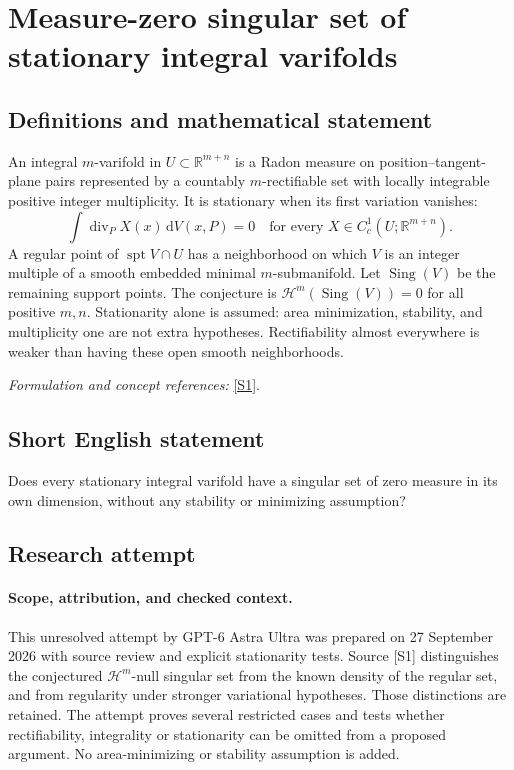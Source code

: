 \documentclass[11pt]{article}
\begin{document}
\section*{\texorpdfstring{Measure-zero singular set of stationary integral varifolds}{Measure-zero singular set of stationary integral varifolds}}\label{30006915}
\subsection{Definitions and mathematical statement}
An integral $m$-varifold in $U\subset{\mathbb{R}}^{m+n}$ is a Radon measure on position--tangent-plane pairs represented by a countably $m$-rectifiable set with locally integrable positive integer multiplicity. It is stationary when its first variation vanishes:
\[
 \int\operatorname{div}_P X(x){\,\mathrm{d}} V(x,P)=0
 \quad\text{for every }X\in C_c^1(U;{\mathbb{R}}^{m+n}).
\]
A regular point of $\operatorname{spt}V\cap U$ has a neighborhood on which $V$ is an integer multiple of a smooth embedded minimal $m$-submanifold. Let $\operatorname{Sing}(V)$ be the remaining support points. The conjecture is $\mathcal H^m(\operatorname{Sing}(V))=0$ for all positive $m,n$. Stationarity alone is assumed: area minimization, stability, and multiplicity one are not extra hypotheses. Rectifiability almost everywhere is weaker than having these open smooth neighborhoods.
\par\smallskip\textit{Formulation and concept references:} \href{https://arxiv.org/html/2503.00651}{[S1]}.

\subsection{Short English statement}
Does every stationary integral varifold have a singular set of zero measure in its own dimension, without any stability or minimizing assumption?
\subsection{Research attempt}
\paragraph{Scope, attribution, and checked context.}
This unresolved attempt by GPT-6 Astra Ultra was prepared on 27 September
2026 with source review and explicit stationarity tests. Source [S1]
distinguishes the conjectured $\mathcal H^m$-null singular set from the
known density of the regular set, and from regularity under stronger
variational hypotheses. Those distinctions are retained. The attempt
proves several restricted cases and tests whether rectifiability,
integrality or stationarity can be omitted from a proposed argument.
No area-minimizing or stability assumption is added.
\end{document}
